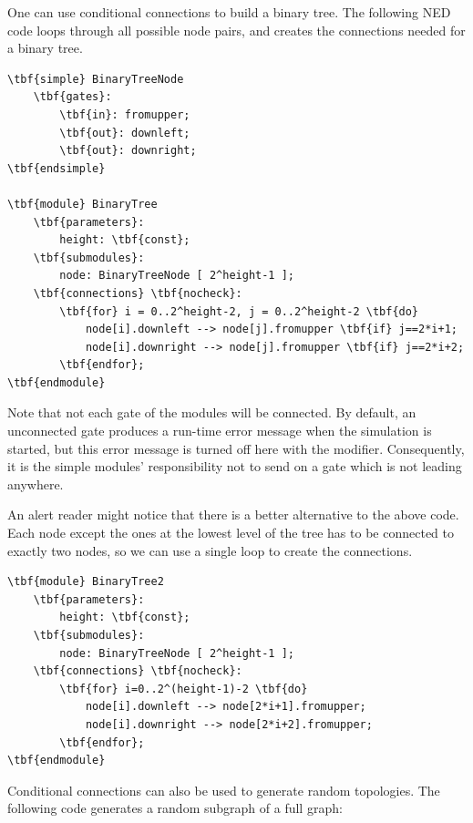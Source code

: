 

One can use conditional connections to build a binary tree.
The following NED code loops through all possible node pairs, and
creates the connections needed for a binary tree.

\begin{Verbatim}[commandchars=\\\{\}]
\tbf{simple} BinaryTreeNode
    \tbf{gates}:
        \tbf{in}: fromupper;
        \tbf{out}: downleft;
        \tbf{out}: downright;
\tbf{endsimple}

\tbf{module} BinaryTree
    \tbf{parameters}:
        height: \tbf{const};
    \tbf{submodules}:
        node: BinaryTreeNode [ 2^height-1 ];
    \tbf{connections} \tbf{nocheck}:
        \tbf{for} i = 0..2^height-2, j = 0..2^height-2 \tbf{do}
            node[i].downleft --> node[j].fromupper \tbf{if} j==2*i+1;
            node[i].downright --> node[j].fromupper \tbf{if} j==2*i+2;
        \tbf{endfor};
\tbf{endmodule}
\end{Verbatim}

Note that not each gate of the modules will be connected. By default,
an unconnected gate produces a run-time error message when the
simulation is started, but this error message is turned off here with
the  modifier.  Consequently, it
is the simple modules' responsibility not to send on a gate which is
not leading anywhere.

An alert reader might notice that there is a better alternative
to the above code. Each node except the ones at the lowest level
of the tree has to be connected to exactly two nodes,
so we can use a single loop to create the connections.

\begin{Verbatim}[commandchars=\\\{\}]
\tbf{module} BinaryTree2
    \tbf{parameters}:
        height: \tbf{const};
    \tbf{submodules}:
        node: BinaryTreeNode [ 2^height-1 ];
    \tbf{connections} \tbf{nocheck}:
        \tbf{for} i=0..2^(height-1)-2 \tbf{do}
            node[i].downleft --> node[2*i+1].fromupper;
            node[i].downright --> node[2*i+2].fromupper;
        \tbf{endfor};
\tbf{endmodule}
\end{Verbatim}




Conditional connections can also be used to generate random
topologies.  The following code generates a
random subgraph of a full graph:


